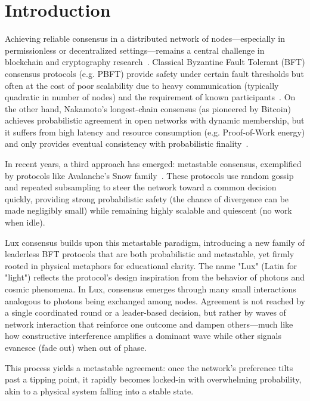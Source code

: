 \section{Introduction}

Achieving reliable consensus in a distributed network of nodes—especially in permissionless or decentralized settings—remains a central challenge in blockchain and cryptography research~\cite{bitcoin,pbft}. Classical Byzantine Fault Tolerant (BFT) consensus protocols (e.g. PBFT) provide safety under certain fault thresholds but often at the cost of poor scalability due to heavy communication (typically quadratic in number of nodes) and the requirement of known participants~\cite{pbft,hotstuff}. On the other hand, Nakamoto's longest-chain consensus (as pioneered by Bitcoin) achieves probabilistic agreement in open networks with dynamic membership, but it suffers from high latency and resource consumption (e.g. Proof-of-Work energy) and only provides eventual consistency with probabilistic finality~\cite{bitcoin,nakamoto}.

In recent years, a third approach has emerged: metastable consensus, exemplified by protocols like Avalanche's Snow family~\cite{avalanche}. These protocols use random gossip and repeated subsampling to steer the network toward a common decision quickly, providing strong probabilistic safety (the chance of divergence can be made negligibly small) while remaining highly scalable and quiescent (no work when idle).

Lux consensus builds upon this metastable paradigm, introducing a new family of leaderless BFT protocols that are both probabilistic and metastable, yet firmly rooted in physical metaphors for educational clarity. The name "Lux" (Latin for "light") reflects the protocol's design inspiration from the behavior of photons and cosmic phenomena. In Lux, consensus emerges through many small interactions analogous to photons being exchanged among nodes. Agreement is not reached by a single coordinated round or a leader-based decision, but rather by waves of network interaction that reinforce one outcome and dampen others—much like how constructive interference amplifies a dominant wave while other signals evanesce (fade out) when out of phase.

This process yields a metastable agreement: once the network's preference tilts past a tipping point, it rapidly becomes locked-in with overwhelming probability, akin to a physical system falling into a stable state.

